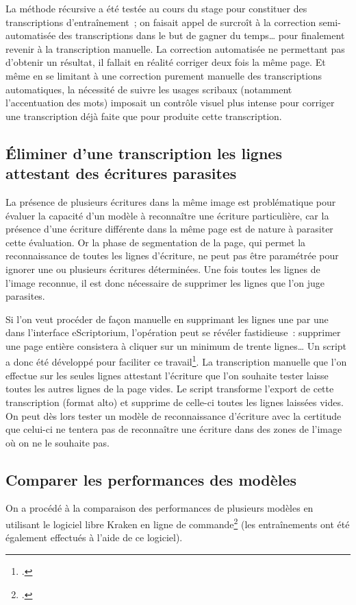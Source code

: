 \documentclass[a4paper,12pt,twoside]{book}
\begin{document}
				La méthode récursive a été testée au cours du stage pour constituer des transcriptions d'entraînement~; on faisait appel de surcroît à la correction semi-automatisée des transcriptions dans le but de gagner du temps… pour finalement revenir à la transcription manuelle. La correction automatisée ne permettant pas d'obtenir un résultat, il fallait en réalité corriger deux fois la même page. Et même en se limitant à une correction purement manuelle des transcriptions automatiques, la nécessité de suivre les usages scribaux (notamment l'accentuation des mots) imposait un contrôle visuel plus intense pour corriger une transcription déjà faite que pour produite cette transcription.
			
			\subsection{Éliminer d'une transcription les lignes attestant des écritures parasites}
				La présence de plusieurs écritures dans la même image est problématique pour évaluer la capacité d'un modèle à reconnaître une écriture particulière, car la présence d'une écriture différente dans la même page est de nature à parasiter cette évaluation. Or la phase de segmentation de la page, qui permet la reconnaissance de toutes les lignes d'écriture, ne peut pas être paramétrée pour ignorer une ou plusieurs écritures déterminées. Une fois toutes les lignes de l'image reconnue, il est donc nécessaire de supprimer les lignes que l'on juge parasites.
				
				Si l'on veut procéder de façon manuelle en supprimant les lignes une par une dans l'interface eScriptorium, l'opération peut se révéler fastidieuse~: supprimer une page entière consistera à cliquer sur un minimum de trente lignes… Un script a donc été développé pour faciliter ce travail\footcite{biaySupprLignesVidesPy2022}. La transcription manuelle que l'on effectue sur les seules lignes attestant l'écriture que l'on souhaite tester laisse toutes les autres lignes de la page vides. Le script transforme l'export de cette transcription (format \gls{alto}) et supprime de celle-ci toutes les lignes laissées vides. On peut dès lors tester un modèle de reconnaissance d'écriture avec la certitude que celui-ci ne tentera pas de reconnaître une écriture dans des zones de l'image où on ne le souhaite pas.
				
			\subsection{Comparer les performances des modèles}
				On a procédé à la comparaison des performances de plusieurs modèles en utilisant le logiciel libre Kraken en ligne de commande\footcite{KrakenDocumentation} (les entraînements ont été également effectués à l'aide de ce logiciel).
				
\end{document}
